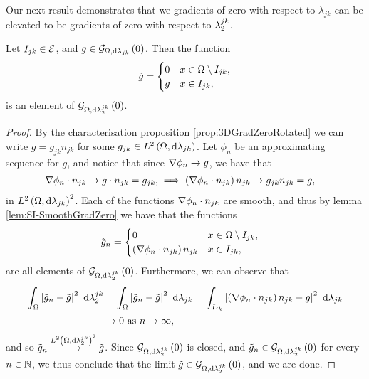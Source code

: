 Our next result demonstrates that we gradients of zero with respect to $\lambda_{jk}$ can be elevated to be gradients of zero with respect to $\lambda_2^{jk}$.
\begin{lemma} \label{lem:SI-GradZeroEdgeToComposite}
	Let $I_{jk}\in\mathcal{E}$, and $g\in\mathcal{G}_{ \Omega, \mathrm{d}\lambda_{jk}}\left( 0 \right)$.
	Then the function
	\begin{align*}
		\tilde{g} = \begin{cases} 0 & x\in\Omega\setminus I_{jk}, \\ g & x\in I_{jk}, \end{cases}
	\end{align*}
	is an element of $\mathcal{G}_{ \Omega, \mathrm{d}\lambda_2^{jk}}\left( 0 \right)$.
\end{lemma}
\begin{proof}
	By the characterisation proposition \ref{prop:3DGradZeroRotated} we can write $g = g_{jk}n_{jk}$ for some $g_{jk}\in L^{2}\left( \Omega,\mathrm{d} \lambda_{jk} \right)$.
	Let $\phi_n$ be an approximating sequence for $g$, and notice that since $\nabla\phi_n\rightarrow g$, we have that
	\begin{align*}
		\nabla\phi_n\cdot n_{jk} \rightarrow g\cdot n_{jk} = g_{jk}, 
		&\implies
		\left(  \nabla\phi_n\cdot n_{jk}  \right)n_{jk} \rightarrow g_{jk}n_{jk} = g,
	\end{align*}
	in $L^{2}\left( \Omega,\mathrm{d} \lambda_{jk} \right)^2$.
	Each of the functions $\nabla\phi_n\cdot n_{jk}$ are smooth, and thus by lemma \ref{lem:SI-SmoothGradZero} we have that the functions
	\begin{align*}
		\tilde{g}_n &= \begin{cases} 0 & x\in\Omega\setminus I_{jk}, \\ \left(  \nabla\phi_n\cdot n_{jk}  \right)n_{jk} & x\in I_{jk}, \end{cases}
	\end{align*}
	are all elements of $\mathcal{G}_{ \Omega, \mathrm{d}\lambda_2^{jk}}\left( 0 \right)$.
	Furthermore, we can observe that
	\begin{align*}
		\int_{\Omega}\left\lvert  \tilde{g}_n - \tilde{g}  \right\rvert^2 \ \mathrm{d}\lambda_2^{jk}
		&= \int_{\Omega}\left\lvert  \tilde{g}_n - \tilde{g}  \right\rvert^2 \ \mathrm{d}\lambda_{jk}
		= \int_{I_{jk}}\left\lvert  \left(  \nabla\phi_n\cdot n_{jk}  \right)n_{jk} - g  \right\rvert^2 \ \mathrm{d}\lambda_{jk} \\
		&\rightarrow 0 \ \text{as} \ n \rightarrow\infty,
	\end{align*}
	and so $\tilde{g}_n\overset{L^{2}\left( \Omega,\mathrm{d} \lambda_2^{jk} \right)^2}{\longrightarrow}\tilde{g}$.
	Since $\mathcal{G}_{ \Omega, \mathrm{d}\lambda_2^{jk}}\left( 0 \right)$ is closed, and $\tilde{g}_n\in\mathcal{G}_{ \Omega, \mathrm{d}\lambda_2^{jk}}\left( 0 \right)$ for every $n\in\mathbb{N}$, we thus conclude that the limit $\tilde{g}\in\mathcal{G}_{ \Omega, \mathrm{d}\lambda_2^{jk}}\left( 0 \right)$, and we are done.
\end{proof}

